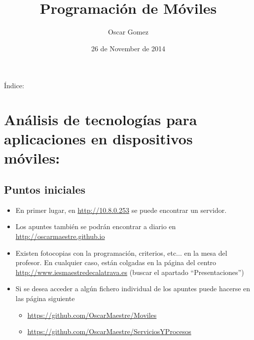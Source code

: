 \documentclass[a4paper,12pt,spanish]{sphinxmanual}
\title{Programación de Móviles}
\date{26 de November de 2014}
\author{Oscar Gomez}
\begin{document}
\maketitle
\tableofcontents
{}\label{index::doc}


Índice:


\chapter{Análisis de tecnologías para aplicaciones en dispositivos móviles:}
\label{tema1::doc}\label{tema1:prog-multimedia-y-de-dispositivos-moviles}\label{tema1:analisis-de-tecnologias-para-aplicaciones-en-dispositivos-moviles}

\section{Puntos iniciales}
\label{tema1:puntos-iniciales}\begin{itemize}
\item {} 
En primer lugar, en \href{http://10.8.0.253}{http://10.8.0.253} se puede encontrar un servidor.

\item {} 
Los apuntes también se podrán encontrar a diario en \href{http://oscarmaestre.github.io}{http://oscarmaestre.github.io}

\item {} 
Existen fotocopias con la programación, criterios, etc... en la mesa del profesor. En cualquier caso, están colgadas en la página del centro \href{http://www.iesmaestredecalatrava.es}{http://www.iesmaestredecalatrava.es} (buscar el apartado ``Presentaciones'')

\item {} 
Si se desea acceder a algún fichero individual de los apuntes puede hacerse en las página siguiente
\begin{itemize}
\item {} 
\href{https://github.com/OscarMaestre/Moviles}{https://github.com/OscarMaestre/Moviles}

\item {} 
\href{https://github.com/OscarMaestre/ServiciosYProcesos}{https://github.com/OscarMaestre/ServiciosYProcesos}

\end{itemize}

\end{itemize}
\end{document}
